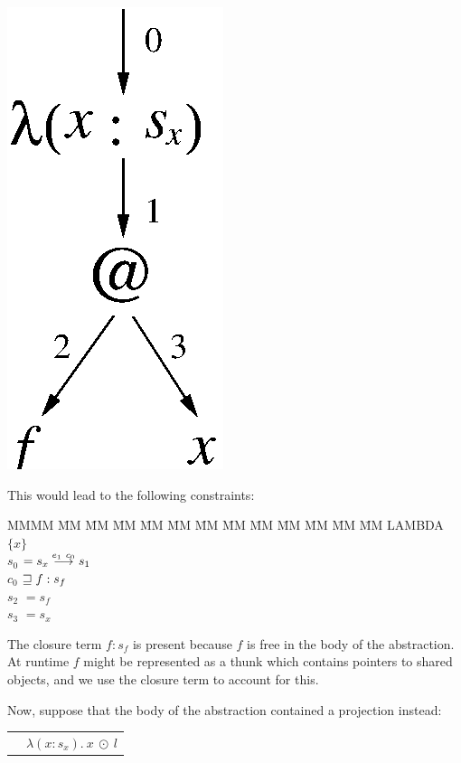 \begin{center}
\includegraphics[scale=0.5]{3-Inference/fig/projections/app-fx.eps}
\end{center}

This would lead to the following constraints:
\begin{tabbing}
MMMM 	\= MM \= MM \= MM \= MM \= MM \= MM \= MM \= MM \= MM \= MM \= MM \= MM \kill
	\> LAMBDA $\{ x \}$ \\
	\>	\> $s_0$ \> $= s_x \stackrel{e_1 \ c_0}{\longrightarrow} s_1$ \\
	\>	\> $c_0$ \> $\sqsupseteq f : s_f$ \\
	\>	\> $s_2$ \> $= s_f$ \\
	\>	\> $s_3$ \> $= s_x$
\end{tabbing}

The closure term $f : s_f$ is present because $f$ is free in the body of the abstraction. At runtime $f$ might be represented as a thunk which contains pointers to shared objects, and we use the closure term to account for this. 

Now, suppose that the body of the abstraction contained a projection instead:

\qq\qq
\begin{tabular}{ll}
	& $\lambda (x : s_x). \ x \ \odot \ l$ \\
\end{tabular}


